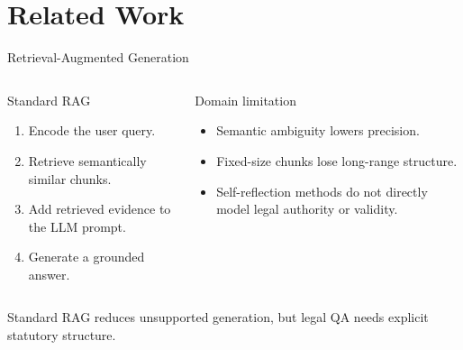 \section{Related Work}

\begin{frame}{Retrieval-Augmented Generation}
\small
\begin{columns}[T]
    \begin{block}{Standard RAG}
      \begin{enumerate}
        \item Encode the user query.
        \item Retrieve semantically similar chunks.
        \item Add retrieved evidence to the LLM prompt.
        \item Generate a grounded answer.
      \end{enumerate}
    \end{block}
    \begin{alertblock}{Domain limitation}
      \begin{itemize}
        \item Semantic ambiguity lowers precision.
        \item Fixed-size chunks lose long-range structure.
        \item Self-reflection methods do not directly model legal authority or validity.
      \end{itemize}
    \end{alertblock}
\end{columns}
\vspace{0.25cm}
\centering
Standard RAG reduces unsupported generation, but legal QA needs explicit statutory structure.
\end{frame}

